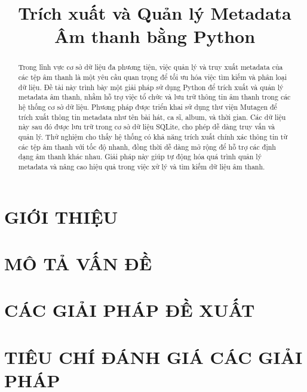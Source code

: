 \documentclass[conference]{IEEEtran}
\begin{document}
\title{Trích xuất và Quản lý Metadata Âm thanh bằng Python}

\author{
}

\maketitle

\begin{abstract}
Trong lĩnh vực cơ sở dữ liệu đa phương tiện, việc quản lý và truy xuất metadata của các tệp âm thanh là một yêu cầu quan trọng để tối ưu hóa việc tìm kiếm và phân loại dữ liệu. Đề tài này trình bày một giải pháp sử dụng Python để trích xuất và quản lý metadata âm thanh, nhằm hỗ trợ việc tổ chức và lưu trữ thông tin âm thanh trong các hệ thống cơ sở dữ liệu. Phương pháp được triển khai sử dụng thư viện Mutagen để trích xuất thông tin metadata như tên bài hát, ca sĩ, album, và thời gian. Các dữ liệu này sau đó được lưu trữ trong cơ sở dữ liệu SQLite, cho phép dễ dàng truy vấn và quản lý. Thử nghiệm cho thấy hệ thống có khả năng trích xuất chính xác thông tin từ các tệp âm thanh với tốc độ nhanh, đồng thời dễ dàng mở rộng để hỗ trợ các định dạng âm thanh khác nhau. Giải pháp này giúp tự động hóa quá trình quản lý metadata và nâng cao hiệu quả trong việc xử lý và tìm kiếm dữ liệu âm thanh.
\end{abstract}


\section{GIỚI THIỆU}


\section{MÔ TẢ VẤN ĐỀ}


\section{CÁC GIẢI PHÁP ĐỀ XUẤT}


\section{TIÊU CHÍ ĐÁNH GIÁ CÁC GIẢI PHÁP}
\end{document}
